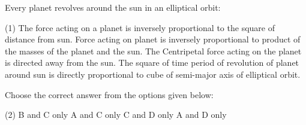 \item Every planet revolves around the sun in an elliptical orbit:
\begin{tasks}(1)
    \task The force acting on a planet is inversely proportional to the square of distance from sun.
    \task Force acting on planet is inversely proportional to product of the masses of the planet and the sun.
    \task The Centripetal force acting on the planet is directed away from the sun.
    \task The square of time period of revolution of planet around sun is directly proportional to cube of semi-major axis of elliptical orbit.
\end{tasks}

Choose the correct answer from the options given below:
\begin{tasks}(2)
    \task B and C only
    \task A and C only
    \task C and D only
    \task A and D only
\end{tasks}